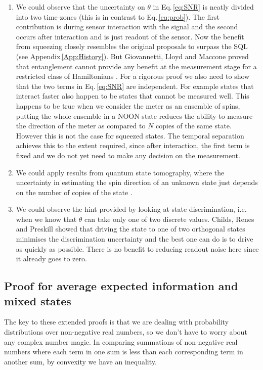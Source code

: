 \documentclass[reqno]{amsart}
\begin{document}
\begin{enumerate}
\item We could observe that the uncertainty on $\theta$ in Eq.\,\eqref{eq:SNR} is neatly divided into two time-zones (this is in contrast to Eq.\,\eqref{eq:prob}). The first contribution is during sensor interaction with the signal and the second occurs after interaction and is just readout of the sensor. Now the benefit from squeezing closely resembles the original proposals to surpass the SQL (see Appendix\,\ref{App:History}). But Giovannetti, Lloyd and Maccone proved that entanglement cannot provide any benefit at the measurement stage for a restricted class of Hamiltonians \cite{Giovannetti2006}. For a rigorous proof we also need to show that the two terms in Eq.\,\eqref{eq:SNR} are independent. For example states that interact faster also happen to be states that cannot be measured well. This happens to be true when we consider the meter as an ensemble of spins, putting the whole ensemble in a NOON state reduces the ability to measure the direction of the meter as compared to $N$ copies of the same state. However this is not the case for squeezed states.  The temporal separation achieves this to the extent required, since after interaction, the first term is fixed and we do not yet need to make any decision on the measurement.

\item We could apply results from quantum state tomography, where the uncertainty in estimating the spin direction of an unknown state just depends on the number of copies of the state \cite{ODonnell2016, Aaronson2018}.

\item We could observe the hint provided by looking at state discrimination, i.e. when we know that $\theta$ can take only one of two discrete values. Childs, Renes and Preskill \cite{Childs2000} showed that driving the state to one of two orthogonal states minimises the discrimination uncertainty and the best one can do is to drive as quickly as possible. There is no benefit to reducing readout noise here since it already goes to zero.\\
\end{enumerate}

\subsection{Proof for average expected information and mixed states}\label{App:Mixed}
The key to these extended proofs is that we are dealing with probability distributions over non-negative real numbers, so we don't have to worry about any complex number magic. In comparing summations of non-negative real numbers where each term in one sum is less than each corresponding term in another sum, by convexity we have an inequality.\\
\end{document}
